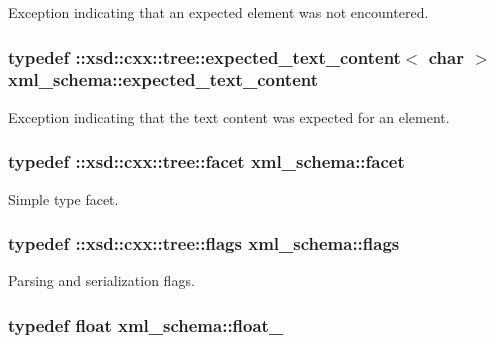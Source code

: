 Exception indicating that an expected element was not encountered. 

\hypertarget{namespacexml__schema_a1994323b3f5fee8db7891f02bb9144b9}{
\subsubsection[{expected\+\_\+text\+\_\+content}]{\setlength{\rightskip}{0pt plus 5cm}typedef \+::xsd\+::cxx\+::tree\+::expected\+\_\+text\+\_\+content$<$ char $>$ {\bf xml\+\_\+schema\+::expected\+\_\+text\+\_\+content}}}\label{namespacexml__schema_a1994323b3f5fee8db7891f02bb9144b9}


Exception indicating that the text content was expected for an element. 

\hypertarget{namespacexml__schema_ae447ddf0dd2470b5a095774e0b359a86}{
\subsubsection[{facet}]{\setlength{\rightskip}{0pt plus 5cm}typedef \+::xsd\+::cxx\+::tree\+::facet {\bf xml\+\_\+schema\+::facet}}}\label{namespacexml__schema_ae447ddf0dd2470b5a095774e0b359a86}


Simple type facet. 

\hypertarget{namespacexml__schema_a8d981c127a1f5106d04ad5853e707361}{
\subsubsection[{flags}]{\setlength{\rightskip}{0pt plus 5cm}typedef \+::xsd\+::cxx\+::tree\+::flags {\bf xml\+\_\+schema\+::flags}}}\label{namespacexml__schema_a8d981c127a1f5106d04ad5853e707361}


Parsing and serialization flags. 

\hypertarget{namespacexml__schema_ad7e04ab17bba0b3fdde43fb79ef6ed87}{
\subsubsection[{float\+\_\+}]{\setlength{\rightskip}{0pt plus 5cm}typedef float {\bf xml\+\_\+schema\+::float\+\_\+}}}\label{namespacexml__schema_ad7e04ab17bba0b3fdde43fb79ef6ed87}


